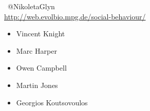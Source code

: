 \documentclass{beamer}
\begin{document}
\begin{frame}
    \begin{center}
    \faTwitter \ @NikoletaGlyn \\
    \url{http://web.evolbio.mpg.de/social-behaviour/}
    \end{center}
    \vspace{1cm}

    \begin{multicols}{3}
        \begin{itemize}
            \item Vincent Knight
            \item Marc Harper
            \item Owen Campbell
            \item Martin Jones
            \item Georgios Koutsovoulos
        \end{itemize}
        \end{multicols}
\end{frame}
\end{document}

